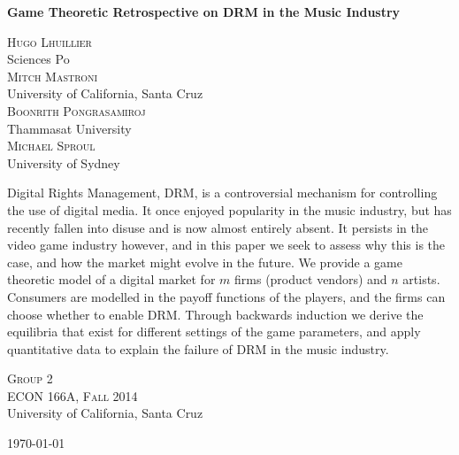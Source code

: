 \documentclass[a4paper,12pt]{article}
\numberwithin{equation}{section}
\renewenvironment{abstract}
 {\normalsize
  \begin{center}
  \bfseries \abstractname\vspace{-.5em}\vspace{0pt}
  \end{center}
  \list{}{%
    \setlength{\leftmargin}{20mm}%
    \setlength{\rightmargin}{\leftmargin}%
  }%
  \item\relax}
 {\endlist}
\begin{document}
\begin{titlepage}
\begin{center}

\vspace*{3cm}
\Large
\begin{changemargin}{2cm}{2cm}
\begin{center}
\textbf{Game Theoretic Retrospective on DRM in the Music Industry}
\end{center}
\end{changemargin}

\vspace*{0.5cm}
\large
\textsc{Hugo Lhuillier}\\
Sciences Po\\[1.2em]
\textsc{Mitch Mastroni}\\
University of California, Santa Cruz\\[1.2em]
\textsc{Boonrith Pongrasamiroj}\\
Thammasat University\\[1.2em]
\textsc{Michael Sproul}\\
University of Sydney

\vspace*{1cm}
\begin{abstract}
Digital Rights Management, DRM, is a controversial mechanism for controlling the use of digital media. It once enjoyed popularity in the music industry, but has recently fallen into disuse and is now almost entirely absent. It persists in the video game industry however, and in this paper we seek to assess why this is the case, and how the market might evolve in the future. We provide a game theoretic model of a digital market for $m$ firms (product vendors) and $n$ artists. Consumers are modelled in the payoff functions of the players, and the firms can choose whether to enable DRM. Through backwards induction we derive the equilibria that exist for different settings of the game parameters, and apply quantitative data to explain the failure of DRM in the music industry.
\end{abstract}

\vfill

\normalsize
\textsc{Group 2}\\[1.2em]
\textsc{ECON 166A, Fall 2014}\\
University of California, Santa Cruz

\today

\end{center}
\end{titlepage}
\pagebreak
\end{document}
